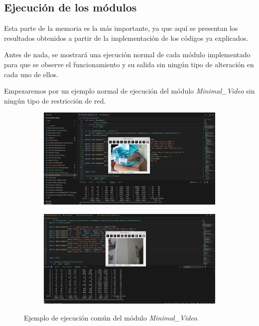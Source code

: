 \label{sec:resultados_y_discusion}

\subsection{Ejecución de los módulos}

Esta parte de la memoria es la más importante, ya que aquí se presentan los resultados obtenidos a partir de la implementación de los códigos ya explicados. 
\vspace{\baselineskip}

Antes de nada, se mostrará una ejecución normal de cada módulo implementado para que se observe el funcionamiento y su salida sin ningún tipo de alteración en cada uno de ellos. 
\vspace{\baselineskip}

Empezaremos por un ejemplo normal de ejecución del módulo \textit{Minimal\_Video} sin ningún tipo de restricción de red.
\begin{figure}
  \centering
  \begin{subfigure}{\textwidth}
    \centering
    \includegraphics[width=\textwidth,height=0.6\textheight,keepaspectratio]{images/pruebas/ejecuion_normal1.png}
  \end{subfigure}
  \vspace{\baselineskip}
  \begin{subfigure}{\textwidth}
    \centering
    \includegraphics[width=\textwidth,height=0.6\textheight,keepaspectratio]{images/pruebas/ejecuion_normal2.png}
  \end{subfigure}
  \caption{Ejemplo de ejecución común del módulo \textit{Minimal\_Video}.}
  \label{fig:ejecucion_doble}
\end{figure}
\vspace{\baselineskip}

